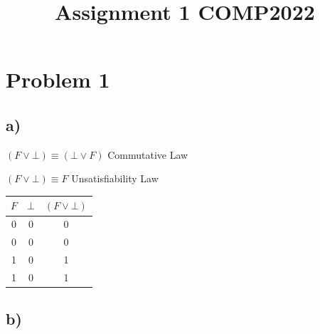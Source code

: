 \documentclass{article} %
\begin{document}
\title{\textbf{Assignment 1 COMP2022}}
\author{}
\date{}
\maketitle

\section*{Problem 1}

\subsection*{\hspace{1cm}a)}

\begin{flushleft}
\hspace{3cm}$(F \lor \bot) \equiv (\bot \lor F)$ \hspace{2cm} Commutative Law

\hspace{3cm}$(F \lor \bot) \equiv F$ \hspace{3cm} Unsatisfiability Law 
\end{flushleft}

\begin{table}[h!]
\hspace{5.5cm}
\begin{tabular}{ | c c | c | }
\hline
 $F$ & $\bot$ & $(F \lor \bot)$ \\ 
 \hline
 0 & 0 & 0 \\  
 0 & 0 & 0 \\
 1 & 0 & 1 \\
 1 & 0 & 1 \\
 \hline
\end{tabular}
\end{table}

\subsection*{\hspace{1cm}b)}
\end{document}
